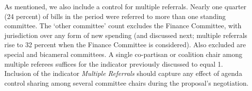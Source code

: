 \documentclass[letter,12pt]{article}
\newcommand{\mc}{\multicolumn}
\begin{document}
\begin{table}
\end{table}

As mentioned, we also include a control for multiple referrals. Nearly one quarter (24 percent) of bills in the period were referred to more than one standing committee. The `other committee' count excludes the Finance Committee, with jurisdiction over any form of new spending (and discussed next; multiple referrals rise to 32 percent when the Finance Committee is considered). Also excluded are special and bicameral committees. A single co-partisan or coalition chair among multiple referees suffices for the indicator previously discussed to equal 1. Inclusion of the indicator \emph{Multiple Referrals} should capture any effect of agenda control sharing among several committee chairs during the proposal's negotiation. 
\end{document}
